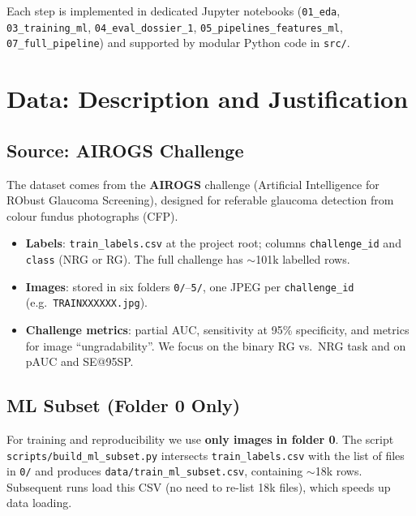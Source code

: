 \documentclass[11pt,a4paper]{article}
\begin{document}
Each step is implemented in dedicated Jupyter notebooks (\texttt{01\_eda}, \texttt{03\_training\_ml}, \texttt{04\_eval\_dossier\_1}, \texttt{05\_pipelines\_features\_ml}, \texttt{07\_full\_pipeline}) and supported by modular Python code in \texttt{src/}.

\section{Data: Description and Justification}

\subsection{Source: AIROGS Challenge}

The dataset comes from the \textbf{AIROGS} challenge (Artificial Intelligence for RObust Glaucoma Screening), designed for referable glaucoma detection from colour fundus photographs (CFP).

\begin{itemize}
  \item \textbf{Labels}: \texttt{train\_labels.csv} at the project root; columns \texttt{challenge\_id} and \texttt{class} (NRG or RG). The full challenge has $\sim$101k labelled rows.
  \item \textbf{Images}: stored in six folders \texttt{0/}--\texttt{5/}, one JPEG per \texttt{challenge\_id} (e.g.\ \texttt{TRAINXXXXXX.jpg}).
  \item \textbf{Challenge metrics}: partial AUC, sensitivity at 95\% specificity, and metrics for image ``ungradability''. We focus on the binary RG vs.\ NRG task and on pAUC and SE@95SP.
\end{itemize}

\subsection{ML Subset (Folder 0 Only)}

For training and reproducibility we use \textbf{only images in folder 0}. The script \texttt{scripts/build\_ml\_subset.py} intersects \texttt{train\_labels.csv} with the list of files in \texttt{0/} and produces \texttt{data/train\_ml\_subset.csv}, containing $\sim$18k rows. Subsequent runs load this CSV (no need to re-list 18k files), which speeds up data loading.
\end{document}

